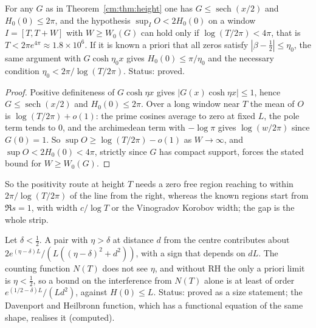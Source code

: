 \begin{theorem}\label{cm:thm:ceiling}
For any $G$ as in Theorem~\ref{cm:thm:height} one has $G\le\operatorname{sech}(x/2)$ and $H_0(0)\le2\pi$, and the hypothesis $\sup_IO<2H_0(0)$ on a window $I=[T,T+W]$ with $W\ge W_0(G)$ can hold only if $\log(T/2\pi)<4\pi$, that is $T<2\pi e^{4\pi}\approx1.8\times10^6$. If it is known a priori that all zeros satisfy $|\beta-\frac12|\le\eta_0$, the same argument with $G\cosh\eta_0x$ gives $H_0(0)\le\pi/\eta_0$ and the necessary condition $\eta_0<2\pi/\log(T/2\pi)$. Status: proved.
\end{theorem}

\begin{proof}
Positive definiteness of $G\cosh\eta x$ gives $|G(x)\cosh\eta x|\le1$, hence $G\le\operatorname{sech}(x/2)$ and $H_0(0)\le2\pi$. Over a long window near $T$ the mean of $O$ is $\log(T/2\pi)+o(1)$: the prime cosines average to zero at fixed $L$, the pole term tends to $0$, and the archimedean term with $-\log\pi$ gives $\log(w/2\pi)$ since $G(0)=1$. So $\sup O\ge\log(T/2\pi)-o(1)$ as $W\to\infty$, and $\sup O<2H_0(0)<4\pi$, strictly since $G$ has compact support, forces the stated bound for $W\ge W_0(G)$.
\end{proof}

So the positivity route at height $T$ needs a zero free region reaching to within $2\pi/\log(T/2\pi)$ of the line from the right, whereas the known regions start from $\Re s=1$, with width $c/\log T$ or the Vinogradov Korobov width; the gap is the whole strip.

\begin{proposition}\label{cm:prop:nt}
Let $\delta<\frac12$. A pair with $\eta>\delta$ at distance $d$ from the centre contributes about $2e^{(\eta-\delta)L}/(L((\eta-\delta)^2+d^2))$, with a sign that depends on $dL$. The counting function $N(T)$ does not see $\eta$, and without RH the only a priori limit is $\eta<\frac12$, so a bound on the interference from $N(T)$ alone is at least of order $e^{(1/2-\delta)L}/(Ld^2)$, against $H(0)\le L$. Status: proved as a size statement; the Davenport and Heilbronn function, which has a functional equation of the same shape, realises it (computed).
\end{proposition}

